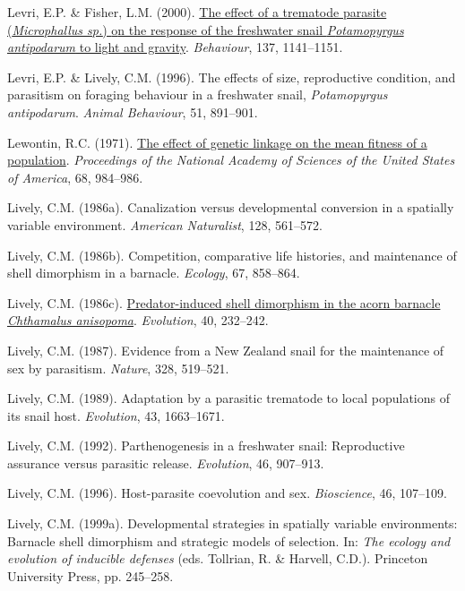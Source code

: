 \documentclass[
  letterpaper,
]{book}
\newlength{\cslhangindent}
\newenvironment{CSLReferences}[2] %
 {\begin{list}{}{%
  \setlength{\itemindent}{0pt}
  \setlength{\leftmargin}{0pt}
  \setlength{\parsep}{0pt}
  \ifodd #1
   \setlength{\leftmargin}{\cslhangindent}
   \setlength{\itemindent}{-1\cslhangindent}
  \fi
  \setlength{\itemsep}{#2\baselineskip}}}
 {\end{list}}
\begin{document}
\begin{CSLReferences}{1}{0}
Levri, E.P. \& Fisher, L.M. (2000).
\href{https://doi.org/10.1163/156853900502565}{The effect of a trematode
parasite (\emph{{M}icrophallus sp.}) {o}n the response of the freshwater
snail \emph{{P}otamopyrgus antipodarum} to light and gravity}.
\emph{Behaviour}, 137, 1141--1151.

Levri, E.P. \& Lively, C.M. (1996). The effects of size, reproductive
condition, and parasitism on foraging behaviour in a freshwater snail,
\emph{{P}otamopyrgus antipodarum}. \emph{Animal Behaviour}, 51,
891--901.

Lewontin, R.C. (1971). \href{https://doi.org/10.1073/pnas.68.5.984}{The
effect of genetic linkage on the mean fitness of a population}.
\emph{Proceedings of the National Academy of Sciences of the United
States of America}, 68, 984--986.

Lively, C.M. (1986a). Canalization versus developmental conversion in a
spatially variable environment. \emph{American Naturalist}, 128,
561--572.

Lively, C.M. (1986b). Competition, comparative life histories, and
maintenance of shell dimorphism in a barnacle. \emph{Ecology}, 67,
858--864.

Lively, C.M. (1986c).
\href{https://doi.org/10.1111/j.1558-5646.1986.tb00466.x}{Predator-induced
shell dimorphism in the acorn barnacle \emph{{C}hthamalus anisopoma}}.
\emph{Evolution}, 40, 232--242.

Lively, C.M. (1987). Evidence from a {New Zealand} snail for the
maintenance of sex by parasitism. \emph{Nature}, 328, 519--521.

Lively, C.M. (1989). Adaptation by a parasitic trematode to local
populations of its snail host. \emph{Evolution}, 43, 1663--1671.

Lively, C.M. (1992). Parthenogenesis in a freshwater snail: Reproductive
assurance versus parasitic release. \emph{Evolution}, 46, 907--913.

Lively, C.M. (1996). Host-parasite coevolution and sex.
\emph{Bioscience}, 46, 107--109.

Lively, C.M. (1999a). Developmental strategies in spatially variable
environments: Barnacle shell dimorphism and strategic models of
selection. In: \emph{The ecology and evolution of inducible defenses}
(eds. Tollrian, R. \& Harvell, C.D.). Princeton University Press, pp.
245--258.


\end{CSLReferences}
\end{document}

